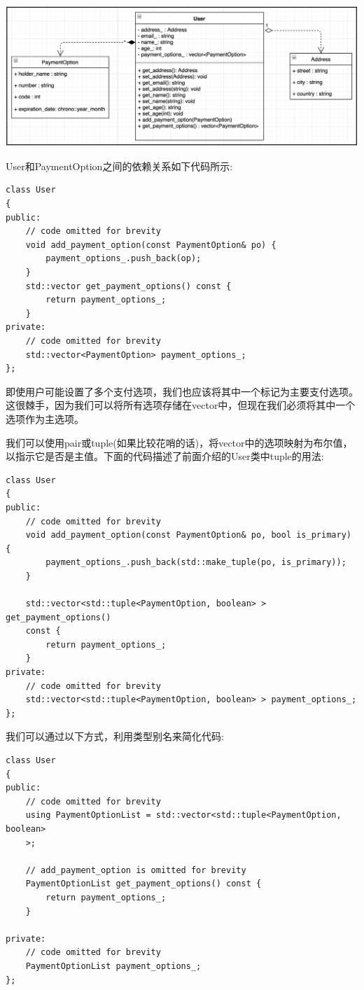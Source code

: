 \begin{center}
	\includegraphics[width=1.\textwidth]{content/Section-2/Chapter-10/7}
\end{center}

User和PaymentOption之间的依赖关系如下代码所示: \par

\begin{lstlisting}[caption={}]
class User
{
public:
	// code omitted for brevity
	void add_payment_option(const PaymentOption& po) {
		payment_options_.push_back(op);
	}
	std::vector get_payment_options() const {
		return payment_options_;
	}
private:
	// code omitted for brevity
	std::vector<PaymentOption> payment_options_;
};
\end{lstlisting}

即使用户可能设置了多个支付选项，我们也应该将其中一个标记为主要支付选项。这很棘手，因为我们可以将所有选项存储在vector中，但现在我们必须将其中一个选项作为主选项。 \par
我们可以使用pair或tuple(如果比较花哨的话)，将vector中的选项映射为布尔值，以指示它是否是主值。下面的代码描述了前面介绍的User类中tuple的用法: \par

\begin{lstlisting}[caption={}]
class User
{
public:
	// code omitted for brevity
	void add_payment_option(const PaymentOption& po, bool is_primary) {
		payment_options_.push_back(std::make_tuple(po, is_primary));
	}

	std::vector<std::tuple<PaymentOption, boolean> > get_payment_options()
	const {
		return payment_options_;
	}
private:
	// code omitted for brevity
	std::vector<std::tuple<PaymentOption, boolean> > payment_options_;
};
\end{lstlisting}

我们可以通过以下方式，利用类型别名来简化代码: \par

\begin{lstlisting}[caption={}]
class User
{
public:
	// code omitted for brevity
	using PaymentOptionList = std::vector<std::tuple<PaymentOption, boolean>
	>;
	
	// add_payment_option is omitted for brevity
	PaymentOptionList get_payment_options() const {
		return payment_options_;
	}

private:
	// code omitted for brevity
	PaymentOptionList payment_options_;
};
\end{lstlisting}

